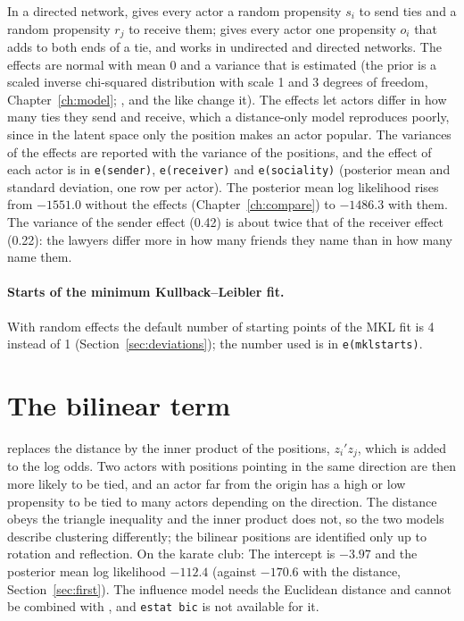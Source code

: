 In a directed network,  gives every actor a random propensity $s_i$ to send ties and  a random propensity $r_j$ to receive them;  gives every actor one propensity $o_i$ that adds to both ends of a tie, and works in undirected and directed networks. The effects are normal with mean 0 and a variance that is estimated (the prior is a scaled inverse chi-squared distribution with scale 1 and 3 degrees of freedom, Chapter~\ref{ch:model}; ,  and the like change it). The effects let actors differ in how many ties they send and receive, which a distance-only model reproduces poorly, since in the latent space only the position makes an actor popular. The variances of the effects are reported with the variance of the positions, and the effect of each actor is in \texttt{e(sender)}, \texttt{e(receiver)} and \texttt{e(sociality)} (posterior mean and standard deviation, one row per actor).
The posterior mean log likelihood rises from $-1551.0$ without the effects (Chapter~\ref{ch:compare}) to $-1486.3$ with them. The variance of the sender effect (0.42) is about twice that of the receiver effect (0.22): the lawyers differ more in how many friends they name than in how many name them.

\paragraph{Starts of the minimum Kullback--Leibler fit.} With random effects the default number of starting points of the MKL fit is 4 instead of 1 (Section~\ref{sec:deviations}); the number used is in \texttt{e(mklstarts)}.

\section{The bilinear term}

 replaces the distance by the inner product of the positions, $z_i'z_j$, which is added to the log odds. Two actors with positions pointing in the same direction are then more likely to be tied, and an actor far from the origin has a high or low propensity to be tied to many actors depending on the direction. The distance obeys the triangle inequality and the inner product does not, so the two models describe clustering differently; the bilinear positions are identified only up to rotation and reflection. On the karate club:
The intercept is $-3.97$ and the posterior mean log likelihood $-112.4$ (against $-170.6$ with the distance, Section~\ref{sec:first}). The influence model needs the Euclidean distance and cannot be combined with , and \texttt{estat bic} is not available for it.

